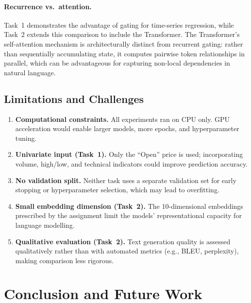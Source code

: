\documentclass[11pt,letterpaper]{article}
\begin{document}
\paragraph{Recurrence vs.\ attention.}
Task~1 demonstrates the advantage of gating for time-series regression, while
Task~2 extends this comparison to include the Transformer.
The Transformer's self-attention mechanism is architecturally distinct from
recurrent gating: rather than sequentially accumulating state, it computes
pairwise token relationships in parallel, which can be advantageous for capturing
non-local dependencies in natural language.

\subsection{Limitations and Challenges}

\begin{enumerate}[noitemsep]
  \item \textbf{Computational constraints.} All experiments ran on CPU only.
        GPU acceleration would enable larger models, more epochs, and
        hyperparameter tuning.
  \item \textbf{Univariate input (Task~1).} Only the ``Open'' price is used;
        incorporating volume, high/low, and technical indicators could improve
        prediction accuracy.
  \item \textbf{No validation split.} Neither task uses a separate validation set
        for early stopping or hyperparameter selection, which may lead to
        overfitting.
  \item \textbf{Small embedding dimension (Task~2).} The 10-dimensional embeddings
        prescribed by the assignment limit the models' representational capacity
        for language modelling.
  \item \textbf{Qualitative evaluation (Task~2).} Text generation quality is
        assessed qualitatively rather than with automated metrics (e.g., BLEU,
        perplexity), making comparison less rigorous.
\end{enumerate}

\section{Conclusion and Future Work}
\end{document}
